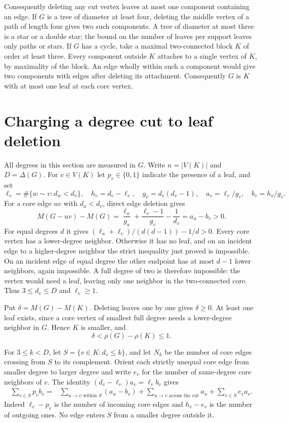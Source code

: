 \documentclass[11pt,a4paper]{article}
\begin{document}
Consequently deleting any cut vertex leaves at most one component containing
an edge. If $G$ is a tree of diameter at least four, deleting the middle
vertex of a path of length four gives two such components. A tree of
diameter at most three is a star or a double star; the bound on the number
of leaves per support leaves only paths or stars. If $G$ has a cycle,
take a maximal two-connected block $K$ of order at least three.
Every component outside $K$ attaches to a single vertex of $K$, by
maximality of the block. An edge wholly within such a component would
give two components with edges after deleting its attachment.
Consequently $G$ is $K$ with at most one leaf at each core vertex.

\section{Charging a degree cut to leaf deletion}\label{p02-cuts}
All degrees in this section are measured in $G$. Write $n=|V(K)|$ and
$D=\Delta(G)$. For $v\in V(K)$ let $p_v\in\{0,1\}$ indicate the
presence of a leaf, and set
\[
 \ell_v=\#\{w\sim v:d_w<d_v\},\quad h_v=d_v-\ell_v,\quad
 g_v=d_v(d_v-1),\quad a_v=\ell_v/g_v,\quad b_v=h_v/g_v .
\]
For a core edge $uv$ with $d_u<d_v$, direct edge deletion gives
\[
 M(G-uv)-M(G)=\frac{\ell_u}{g_u}
                 +\frac{\ell_v-1}{g_v}-\frac1{d_v}
               =a_u-b_v>0 .
\]
For equal degrees $d$ it gives $(\ell_u+\ell_v)/(d(d-1))-1/d>0$.
Every core vertex has a lower-degree neighbor. Otherwise it has no
leaf, and on an incident edge to a higher-degree neighbor the strict
inequality just proved is impossible. On an incident edge of equal
degree the other endpoint has at most $d-1$ lower neighbors, again
impossible. A full degree of two is therefore impossible: the vertex
would need a leaf, leaving only one neighbor in the two-connected
core. Thus $3\le d_v\le D$ and $\ell_v\ge1$.

Put $\delta=M(G)-M(K)$. Deleting leaves one by one gives $\delta\ge0$.
At least one leaf exists, since a core vertex of smallest full degree
needs a lower-degree neighbor in $G$. Hence $K$ is smaller, and
\[
 \delta<\rho(G)-\rho(K)\le1.
\]

For $3\le k<D$, let $S=\{v\in K:d_v\le k\}$, and let $N_k$ be the
number of core edges crossing from $S$ to its complement. Orient each
strictly unequal core edge from smaller degree to larger degree and
write $e_v$ for the number of same-degree core neighbors of $v$.
The identity $(d_v-\ell_v)a_v=\ell_v b_v$ gives
\begin{align*}
 \sum_{v\in S}p_v b_v
  ={}&\sum_{u\to v\text{ within } S}(a_u-b_v)
      +\sum_{u\to v\text{ across the cut}} a_u
      +\sum_{v\in S}e_v a_v .
\end{align*}
Indeed $\ell_v-p_v$ is the number of incoming core edges and
$h_v-e_v$ is the number of outgoing ones. No edge enters $S$ from
a smaller degree outside it.
\end{document}
